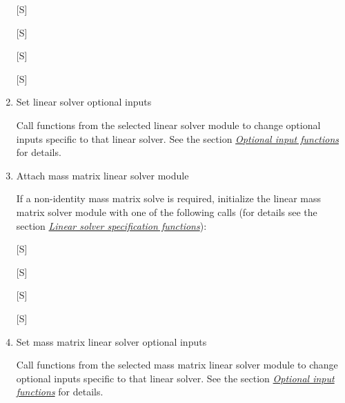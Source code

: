 \documentclass[letterpaper,10pt,english]{sphinxmanual}
\begin{document}
\begin{enumerate}
{[}S{]} 

{[}S{]} 

{[}S{]} 

{[}S{]} 






\item {} 
Set linear solver optional inputs

Call  functions from the selected linear solver module to
change optional inputs specific to that linear solver. See the section
{\hyperref[c_interface/User_callable:cinterface-optionalinputs]{\emph{Optional input functions}}} for details.

\item {} 
Attach mass matrix linear solver module

If a non-identity mass matrix solve is required, initialize the
linear mass matrix solver module with one of the following calls
(for details see the section {\hyperref[c_interface/User_callable:cinterface-linearsolvers]{\emph{Linear solver specification functions}}}):

{[}S{]} 

{[}S{]} 

{[}S{]} 

{[}S{]} 






\item {} 
Set mass matrix linear solver optional inputs

Call  functions from the selected mass matrix linear
solver module to change optional inputs specific to that linear
solver. See the section {\hyperref[c_interface/User_callable:cinterface-optionalinputs]{\emph{Optional input functions}}} for details.


\end{enumerate}
\end{document}
